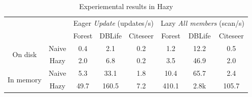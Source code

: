 \begin{table}[h]
    \centering
    \begin{tabular}{|c|c|c|c|c|c|c|c|}\hline
        && \multicolumn{3}{|c|}{Eager {\em Update} (updates/s)}&\multicolumn{3}{|c|}{Lazy {\em All members} (scan/s)}  \\\hhline{~~------}
        &&Forest&DBLife & Citeseer & Forest & DBLife & Citeseer\\\hline
    \multirow{2}{*}{On disk}&Naive&0.4 & 2.1 & 0.2 & 1.2 & 12.2 & 0.5\\\hhline{~-------}
    &Hazy&2.0 & 6.8 & 0.2 & 3.5 & 46.9 & 2.0\\\hline
    \multirow{2}{*}{In memory}&Naive&5.3 & 33.1 & 1.8 & 10.4 & 65.7 & 2.4\\\hhline{~-------}
    &Hazy&49.7 & 160.5 & 7.2 & 410.1 & 2.8k & 105.7\\\hline
    \end{tabular}
    \caption{Experiemental results in Hazy}
    \label{tab:hazy_exp}
\end{table}


